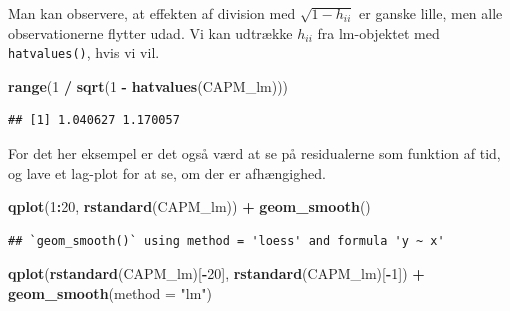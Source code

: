 \documentclass[
]{article}
\newenvironment{Shaded}{\begin{snugshade}}{\end{snugshade}}
\newcommand{\DataTypeTok}[1]{\textcolor[rgb]{0.13,0.29,0.53}{#1}}
\newcommand{\DecValTok}[1]{\textcolor[rgb]{0.00,0.00,0.81}{#1}}
\newcommand{\KeywordTok}[1]{\textcolor[rgb]{0.13,0.29,0.53}{\textbf{#1}}}
\newcommand{\NormalTok}[1]{#1}
\newcommand{\OperatorTok}[1]{\textcolor[rgb]{0.81,0.36,0.00}{\textbf{#1}}}
\newcommand{\StringTok}[1]{\textcolor[rgb]{0.31,0.60,0.02}{#1}}
\begin{document}
Man kan observere, at effekten af division med \(\sqrt{1 - h_{ii}}\) er
ganske lille, men alle observationerne flytter udad. Vi kan udtrække
\(h_{ii}\) fra lm-objektet med \texttt{hatvalues()}, hvis vi vil.

\begin{Shaded}
\begin{Highlighting}[]
\KeywordTok{range}\NormalTok{(}\DecValTok{1} \OperatorTok{/}\StringTok{ }\KeywordTok{sqrt}\NormalTok{(}\DecValTok{1} \OperatorTok{-}\StringTok{ }\KeywordTok{hatvalues}\NormalTok{(CAPM_lm)))}
\end{Highlighting}
\end{Shaded}

\begin{verbatim}
## [1] 1.040627 1.170057
\end{verbatim}

For det her eksempel er det også værd at se på residualerne som funktion
af tid, og lave et lag-plot for at se, om der er afhængighed.

\begin{Shaded}
\begin{Highlighting}[]
\KeywordTok{qplot}\NormalTok{(}\DecValTok{1}\OperatorTok{:}\DecValTok{20}\NormalTok{, }\KeywordTok{rstandard}\NormalTok{(CAPM_lm)) }\OperatorTok{+}\StringTok{ }
\StringTok{    }\KeywordTok{geom_smooth}\NormalTok{()}
\end{Highlighting}
\end{Shaded}

\begin{verbatim}
## `geom_smooth()` using method = 'loess' and formula 'y ~ x'
\end{verbatim}

\begin{Shaded}
\begin{Highlighting}[]
\KeywordTok{qplot}\NormalTok{(}\KeywordTok{rstandard}\NormalTok{(CAPM_lm)[}\OperatorTok{-}\DecValTok{20}\NormalTok{], }\KeywordTok{rstandard}\NormalTok{(CAPM_lm)[}\OperatorTok{-}\DecValTok{1}\NormalTok{]) }\OperatorTok{+}\StringTok{ }
\StringTok{    }\KeywordTok{geom_smooth}\NormalTok{(}\DataTypeTok{method =} \StringTok{"lm"}\NormalTok{)}
\end{Highlighting}
\end{Shaded}
\end{document}
